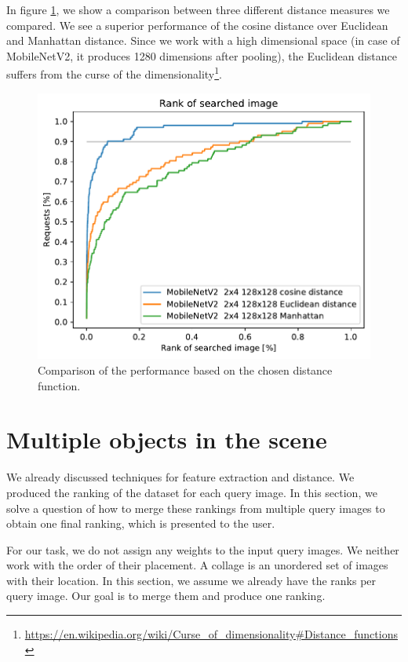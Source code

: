 In figure \ref{fig:regions_distances}, we show a comparison between three different distance measures we compared. We see a superior performance of the cosine distance over Euclidean and Manhattan distance. Since we work with a high dimensional space (in case of MobileNetV2, it produces 1280 dimensions after pooling), the Euclidean distance suffers from the curse of the dimensionality\footnote{\url{https://en.wikipedia.org/wiki/Curse\_of\_dimensionality\#Distance\_functions}}. 

\begin{figure}
    \centering
    \includegraphics[width=0.8\linewidth]{graphs/3aab502ea602a9f49afaa0a0d998cf226a0a67b9efcaa655d2ddf5063eeabe47.pdf}
    \caption{Comparison of the performance based on the chosen distance function.}
    \label{fig:regions_distances}
\end{figure}

\section{Multiple objects in the scene}

We already discussed techniques for feature extraction and distance. We produced the ranking of the dataset for each query image. In this section, we solve a question of how to merge these rankings from multiple query images to obtain one final ranking, which is presented to the user.

For our task, we do not assign any weights to the input query images. We neither work with the order of their placement. A collage is an unordered set of images with their location. In this section, we assume we already have the ranks per query image. Our goal is to merge them and produce one ranking.

